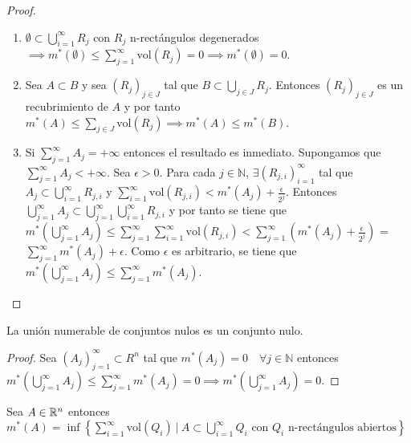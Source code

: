 \begin{proof}
    \leavevmode
    \begin{enumerate}
        \item $\emptyset \subset \bigcup_{i=1}^\infty R_j$ con $R_j$ n-rectángulos degenerados $\implies m^*(\emptyset) \leq \sum_{j=1}^\infty \text{vol}(R_j) = 0 \implies m^*(\emptyset) = 0$.
        \item Sea $A \subset B$ y sea $(R_j)_{j \in J}$ tal que $B \subset \bigcup_{j \in
                      J} R_j$. Entonces $(R_j)_{j \in J}$ es un recubrimiento de $A$ y por tanto
              $m^*(A) \leq \sum_{j \in J} \text{vol}(R_j) \implies m^*(A) \leq m^*(B)$.
        \item Si $\sum_{j=1}^{\infty}{A_j} = +\infty$ entonces el resultado es inmediato.
              Supongamos que $\sum_{j=1}^{\infty}{A_j} < +\infty$. Sea $\epsilon > 0$. Para
              cada $j \in \mathbb{N}$, $\exists (R_{j,i})_{i = 1}^\infty$ tal que $A_j
                  \subset \bigcup_{i = 1}^\infty R_{j,i}$ y $\sum_{i = 1}^\infty
                  \text{vol}(R_{j,i}) < m^*(A_j) + \frac{\epsilon}{2^j}$. Entonces
              $\bigcup_{j=1}^{\infty} A_j \subset \bigcup_{j=1}^{\infty} \bigcup_{i =
                      1}^\infty R_{j,i}$ y por tanto se tiene que $m^*(\bigcup_{j=1}^{\infty} A_j)
                  \leq \sum_{j=1}^{\infty} \sum_{i = 1}^\infty \text{vol}(R_{j,i}) <
                  \sum_{j=1}^{\infty} (m^*(A_j) + \frac{\epsilon}{2^j})$ = $\sum_{j=1}^{\infty}
                  m^*(A_j) + \epsilon$. Como $\epsilon$ es arbitrario, se tiene que
              $m^*(\bigcup_{j=1}^{\infty} A_j) \leq \sum_{j=1}^{\infty} m^*(A_j)$.
    \end{enumerate}
\end{proof}

\begin{corolario}
    La unión numerable de conjuntos nulos es un conjunto nulo.
\end{corolario}

\begin{proof}
    Sea $(A_j)_{j=1}^\infty \subset R^n$ tal que $m^*(A_j) = 0 \quad \forall j \in \mathbb{N}$ entonces $m^*(\bigcup_{j=1}^\infty A_j) \leq \sum_{j=1}^\infty m^*(A_j) = 0 \implies m^*(\bigcup_{j=1}^\infty A_j) = 0$.
\end{proof}

\begin{lema}
    Sea $A \in \mathbb{R}^n$ entonces $m^*(A) = \inf \left\{ \sum_{i=1}^\infty \text{vol}(Q_i) \ | \ A \subset \bigcup_{i=1}^\infty Q_i \text{ con } Q_i \text{ n-rectángulos abiertos} \right\}$
\end{lema}


